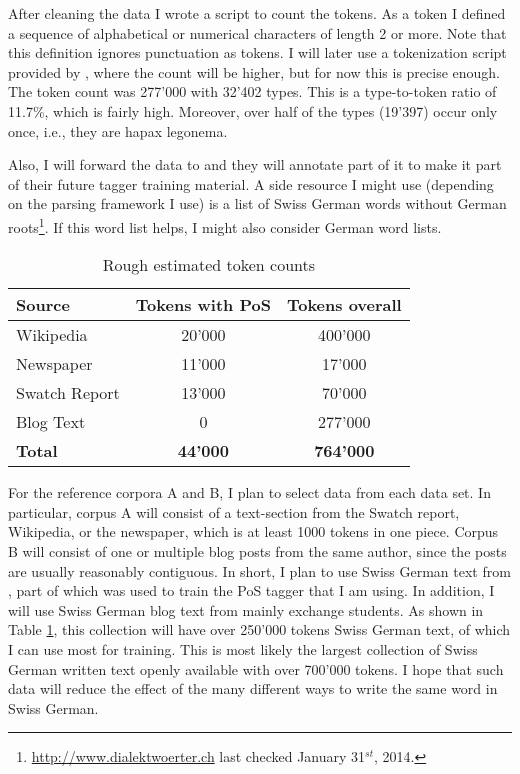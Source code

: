 \documentclass[11pt,letterpaper, covington]{article}
\begin{document}
After cleaning the data I wrote a script to count the tokens. As a token I defined a sequence of alphabetical or numerical characters of length 2 or more. Note that this definition ignores punctuation as tokens. I will later use a tokenization script provided by \citet{AH14}, where the count will be higher, but for now this is precise enough. The token count was 277'000 with 32'402 types. This is a type-to-token ratio of 11.7\%, which is fairly high. Moreover, over half of the types (19'397) occur only once, i.e., they are hapax legonema.

Also, I will forward the data to \citet{AH14} and they will annotate part of it to make it part of their future tagger training material. A side resource I might use (depending on the parsing framework I use) is a list of Swiss German words without German roots\footnote{\url{http://www.dialektwoerter.ch} last checked January 31$^{st}$, 2014.}. If this word list helps, I might also consider German word lists.

\begin{table}
\center
\begin{tabular}{ | l | c | c | }
   \hline
   \textbf{Source} & \textbf{Tokens with PoS} & \textbf{Tokens overall} \\ \hline
   Wikipedia & 20'000 & 400'000 \\
   Newspaper & 11'000 & 17'000 \\ 
   Swatch Report & 13'000 & 70'000 \\
   Blog Text & 0 & 277'000 \\ \hline
   \textbf{Total} & \textbf{44'000} & \textbf{764'000} \\ \hline
\end{tabular}
\caption{Rough estimated token counts}
\label{tab:tokcnt}
\end{table}

For the reference corpora A and B, I plan to select data from each data set. In particular, corpus A will consist of a text-section from the Swatch report, Wikipedia, or the newspaper, which is at least 1000 tokens in one piece. Corpus B will consist of one or multiple blog posts from the same author, since the posts are usually reasonably contiguous. In short, I plan to use Swiss German text from \cite{AH14}, part of which was used to train the PoS tagger that I am using. In addition, I will use Swiss German blog text from mainly exchange students. As shown in Table \ref{tab:tokcnt}, this collection will have over 250'000 tokens Swiss German text, of which I can use most for training. This is most likely the largest collection of Swiss German written text openly available with over 700'000 tokens. I hope that such data will reduce the effect of the many different ways to write the same word in Swiss German.
\end{document}

